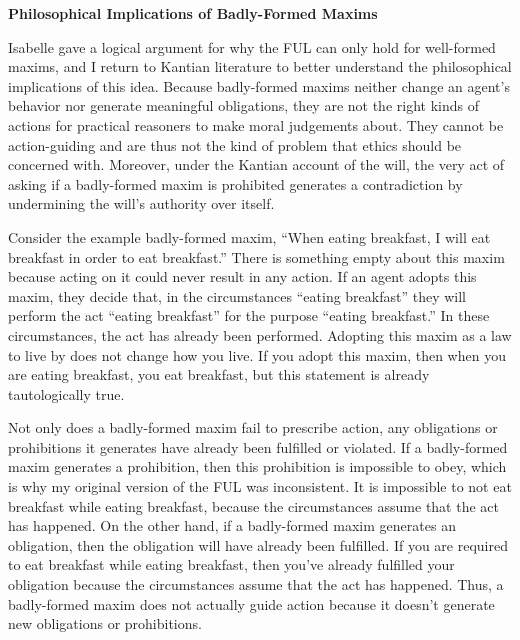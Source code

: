 \begin{isabellebody}
\begin{isamarkuptext}
\noindent \textbf{Philosophical Implications of Badly-Formed Maxims}

Isabelle gave a logical argument for why the FUL can only hold for well-formed maxims, and I return to Kantian
literature to better understand the philosophical implications of this idea. Because badly-formed maxims
neither change an agent's behavior nor generate meaningful obligations, they are not the right kinds of 
actions for practical reasoners to make moral judgements about. They cannot be action-guiding and are thus not the kind of problem that 
ethics should be concerned with. Moreover, under the Kantian account of the will, the very act of asking 
if a badly-formed maxim is prohibited generates a contradiction by undermining the will's authority over itself. 

Consider the example badly-formed maxim, ``When eating breakfast, I will eat breakfast in order to 
eat breakfast.'' There is something empty about this maxim because acting on it could never result in 
any action. If an agent adopts this maxim, 
they decide that, in the circumstances ``eating breakfast'' they will perform the act ``eating breakfast''
for the purpose ``eating breakfast.'' In these circumstances, the act has 
already been performed. Adopting this maxim as a law to live by does not change how you live. If you adopt 
this maxim, then when you are eating breakfast, you eat breakfast, but this statement is already tautologically true. 

Not only does a badly-formed maxim fail to prescribe action, any obligations or prohibitions it 
generates have already been fulfilled or violated. If a badly-formed maxim generates a prohibition, 
then this prohibition is impossible to obey, which is why my original version of the FUL was inconsistent. 
It is impossible to not eat breakfast while eating breakfast, because the circumstances assume that the 
act has happened. On the other hand, if a badly-formed maxim generates an obligation, then the obligation 
will have already been fulfilled. If you are required to eat breakfast while eating breakfast, then you've 
already fulfilled your obligation because the circumstances assume that the act has happened. Thus, 
a badly-formed maxim does not actually guide action because it doesn't generate new obligations or 
prohibitions. 


\end{isamarkuptext}
\end{isabellebody}
